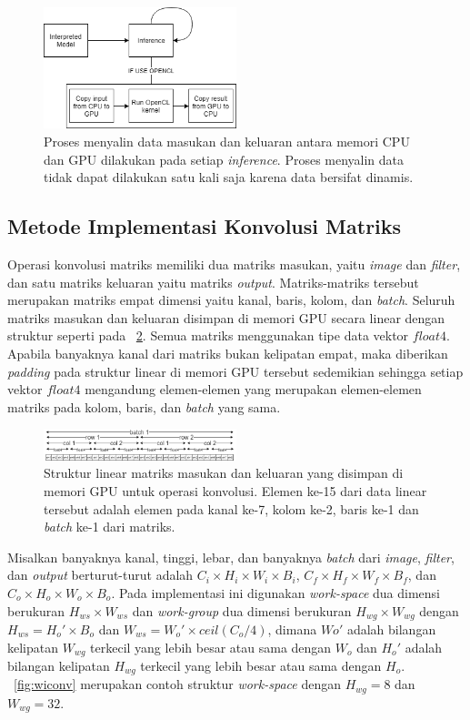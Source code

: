 \begin{figure}
	\centering
	\includegraphics[width=0.50\textwidth]
	{pics/copydata.png}
	\caption{Proses menyalin data masukan dan keluaran antara memori CPU dan GPU dilakukan pada setiap \textit{inference}. Proses menyalin data tidak dapat dilakukan satu kali saja karena data bersifat dinamis.}
	\label{fig:copydata}
\end{figure}

\subsection{Metode Implementasi Konvolusi Matriks }
Operasi konvolusi matriks memiliki dua matriks masukan, yaitu \textit{image} dan \textit{filter}, dan satu matriks keluaran yaitu matriks \textit{output}. Matriks-matriks tersebut merupakan matriks empat dimensi yaitu kanal, baris, kolom, dan \textit{batch}. Seluruh matriks masukan dan keluaran disimpan di memori GPU secara linear dengan struktur seperti pada \pic~\ref{fig:linearconv}. Semua matriks menggunakan tipe data vektor $float4$. Apabila banyaknya kanal dari matriks bukan kelipatan empat, maka diberikan \textit{padding} pada struktur linear di memori GPU tersebut sedemikian sehingga setiap vektor $float4$ mengandung elemen-elemen yang merupakan elemen-elemen matriks pada kolom, baris, dan \textit{batch} yang sama. 

\begin{figure}
	\centering
	\includegraphics[width=0.50\textwidth]
	{pics/linearconv.png}
	\caption{Struktur linear matriks masukan dan keluaran yang disimpan di memori GPU untuk operasi konvolusi. Elemen ke-15 dari data linear tersebut adalah elemen pada kanal ke-7, kolom ke-2, baris ke-1 dan \textit{batch} ke-1 dari matriks.}
	\label{fig:linearconv}
\end{figure}

Misalkan banyaknya kanal, tinggi, lebar, dan banyaknya \textit{batch} dari \textit{image}, \textit{filter}, dan \textit{output} berturut-turut adalah $C_i \times H_i \times W_i \times B_i$, $C_f \times H_f \times W_f \times B_f$, dan $C_o \times H_o \times W_o \times B_o$. Pada implementasi ini digunakan \textit{work-space} dua dimensi berukuran $H_{ws} \times W_{ws}$ dan \textit{work-group} dua dimensi berukuran $H_{wg} \times W_{wg}$ dengan $H_{ws} = H_o' \times B_o$ dan $W_{ws} = W_o' \times ceil(C_o/4)$, dimana $Wo'$ adalah bilangan kelipatan $W_{wg}$ terkecil yang lebih besar atau sama dengan $W_o$ dan $H_o'$ adalah bilangan kelipatan $H_{wg}$ terkecil yang lebih besar atau sama dengan $H_o$. \pic~\ref{fig:wiconv} merupakan contoh struktur \textit{work-space} dengan $H_{wg} = 8$ dan $W_{wg} = 32$.


